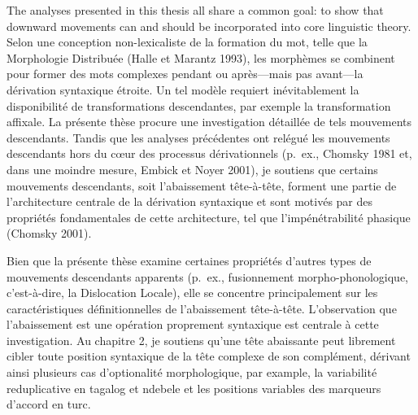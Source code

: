 The analyses presented in this thesis all share a common goal: to show that downward movements can and should be incorporated into core linguistic theory.
\clearpage
\noindent
\mbox{}\\
Selon une conception non-lexicaliste de la formation du mot, telle que la Morphologie Distribu\'{e}e (Halle et Marantz 1993),  les morph\`{e}mes se combinent pour former des mots complexes pendant ou apr\`{e}s---mais pas avant---la d\'{e}rivation syntaxique \'{e}troite. Un tel mod\`{e}le requiert in\'{e}vitablement la disponibilit\'{e} de transformations descendantes, par exemple la transformation affixale.  La pr\'{e}sente th\`{e}se procure une investigation d\'{e}taill\'{e}e de tels mouvements descendants. Tandis que les analyses pr\'{e}c\'{e}dentes ont rel\'{e}gu\'{e} les mouvements descendants hors du c\oe ur des processus d\'{e}rivationnels (p.\ ex., Chomsky 1981 et, dans une moindre mesure, Embick et Noyer 2001), je soutiens que certains mouvements descendants, soit l'abaissement t\^{e}te-\`{a}-t\^{e}te, forment une partie de l'architecture centrale de la d\'{e}rivation syntaxique et sont motiv\'{e}s par des propri\'{e}t\'{e}s fondamentales de cette architecture, tel que l'imp\'{e}n\'{e}trabilit\'{e} phasique (Chomsky 2001).

Bien que la pr\'{e}sente th\`{e}se examine certaines propri\'{e}t\'{e}s d'autres types de mouvements descendants apparents (p.\ ex., fusionnement morpho-phonologique, c'est-\`{a}-dire, la Dislocation Locale), elle se concentre principalement sur les caract\'{e}ristiques d\'{e}finitionnelles de l'abaissement t\^{e}te-\`{a}-t\^{e}te. L'observation que l'abaissement est une op\'{e}ration proprement syntaxique est centrale \`{a} cette investigation. Au chapitre 2, je soutiens qu'une t\^{e}te abaissante peut librement cibler toute position syntaxique de la t\^{e}te complexe de son compl\'{e}ment, d\'{e}rivant ainsi plusieurs cas d'optionalit\'{e} morphologique, par example, la variabilit\'{e} reduplicative en tagalog et ndebele et les positions variables des marqueurs d'accord en turc.

